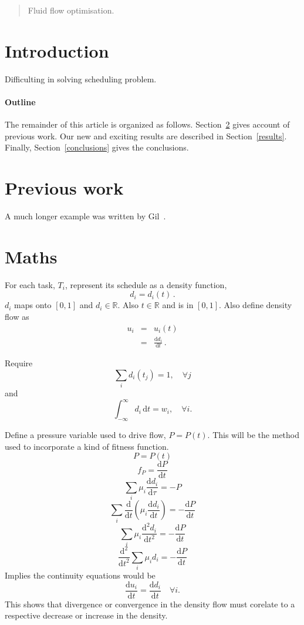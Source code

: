\documentclass[12pt]{article}
\newcommand{\deriv}[2]{\ensuremath{\frac{\mathrm{d}#1}{\mathrm{d}#2}}}
\newcommand{\sderiv}[2]{\ensuremath{\frac{\mathrm{d}^2#1}{\mathrm{d}#2^2}}}
\begin{document}
\maketitle

\begin{abstract}
  Fluid flow optimisation.
\end{abstract}

\section{Introduction}
Difficulting in solving scheduling problem.

\paragraph{Outline}
The remainder of this article is organized as follows.
Section~\ref{previous work} gives account of previous work.
Our new and exciting results are described in Section~\ref{results}.
Finally, Section~\ref{conclusions} gives the conclusions.

\section{Previous work}\label{previous work}
A much longer \LaTeXe{} example was written by Gil~\cite{Gil:02}.

\section{Maths}
For each task, $T_i$, represent its schedule as a density function,
  \[ d_i = d_i\left( t \right) \,. \]
$d_i$ maps onto $\left[0, 1\right]$ and $d_i \in \mathbb{R}$. Also
$t \in \mathbb{R}$ and is in $\left[0, 1\right]$. Also define density
flow as
\begin{eqnarray*}
  u_i & = & u_i\left( t \right) \\
      & = & \deriv{d_i}{t} \,.
\end{eqnarray*}

Require
  \[ \sum_i d_i\left( t_j \right) = 1, \quad \forall j \]
and
  \[ \int_{-\infty}^{\infty} d_i \, \mathrm{d}t = w_i, \quad \forall i . \]

Define a pressure variable used to drive flow, $P = P\left( t \right)$.
This will be the method used to incorporate a kind of fitness function.
  \[ P = P\left( t \right) \]
  \[ f_P = \deriv{P}{t} \]
  \[ \sum_i \mu_i\deriv{d_i}{\tau} = -P \]
  \[ \sum_i \deriv{}{t}\left(\mu_i\deriv{d_i}{t}\right) = -\deriv{P}{t} \]
  \[ \sum_i \mu_i\sderiv{d_i}{t} = -\deriv{P}{t} \]
  \[ \sderiv{}{t}\sum_i\mu_id_i = -\deriv{P}{t} \]
Implies the continuity equations would be
  \[ \deriv{u_i}{t} = \deriv{d_i}{t} \quad \forall i . \]
This shows that divergence or convergence in the density flow must corelate
to a respective decrease or increase in the density.
\end{document}
